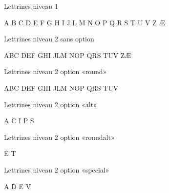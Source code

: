 \documentclass[12pt, twoside, french, openany]{book}
\begin{document}
Lettrines niveau 1

{\begingroup\descleeflora\fontsize{53}{53}\selectfont A B C D E F G H I J L M N O P Q R S T U V Z Æ\endgroup}

Lettrines niveau 2 sans option

{\begingroup\solesmescaps\fontsize{125}{125}\selectfont ABC DEF GHI JLM NOP QRS TUV ZÆ\endgroup}

Lettrines niveau 2 option «round»

{\begingroup\solesmescapsround\fontsize{125}{125}\selectfont ABC DEF GHI JLM NOP QRS TUV\endgroup}

Lettrines niveau 2 option «alt»

{\begingroup\solesmescapsalt\fontsize{125}{125}\selectfont A C I P S\endgroup}

Lettrines niveau 2 option «roundalt»

{\begingroup\solesmescapsroundalt\fontsize{125}{125}\selectfont E T\endgroup}

Lettrines niveau 2 option «special»

{\begingroup\solesmescapsspecial\fontsize{125}{125}\selectfont A D E V\endgroup}
\end{document}
